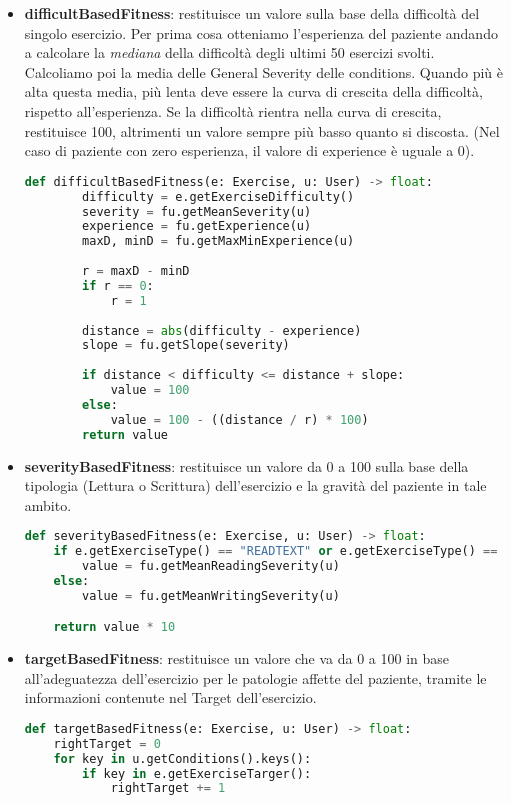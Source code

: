 \documentclass{article}
\begin{document}
\begin{itemize}

\item\textbf{difficultBasedFitness}: restituisce un valore sulla base della difficoltà del singolo esercizio. Per prima cosa otteniamo l'esperienza del paziente andando a calcolare la \textit{mediana} della difficoltà degli ultimi 50 esercizi svolti. Calcoliamo poi la media delle General Severity delle conditions. Quando più è alta questa media, più lenta deve essere la curva di crescita della difficoltà, rispetto all'esperienza. Se la difficoltà rientra nella curva di crescita, restituisce 100, altrimenti un valore sempre più basso quanto si discosta. (Nel caso di paziente con zero esperienza, il valore di experience è uguale a 0).
\begin{lstlisting}[language = Python]
    def difficultBasedFitness(e: Exercise, u: User) -> float:
        difficulty = e.getExerciseDifficulty()
        severity = fu.getMeanSeverity(u)
        experience = fu.getExperience(u)
        maxD, minD = fu.getMaxMinExperience(u)
    
        r = maxD - minD
        if r == 0:
            r = 1
    
        distance = abs(difficulty - experience)
        slope = fu.getSlope(severity)
    
        if distance < difficulty <= distance + slope:
            value = 100
        else:
            value = 100 - ((distance / r) * 100)
        return value
\end{lstlisting}


\item\textbf{severityBasedFitness}: restituisce un valore da 0 a 100 sulla base della tipologia (Lettura o Scrittura) dell'esercizio e la gravità del paziente in tale ambito.
\begin{lstlisting}[language = Python]
    def severityBasedFitness(e: Exercise, u: User) -> float:
    if e.getExerciseType() == "READTEXT" or e.getExerciseType() == "TEXTTOIMAGES" or e.getExerciseType() == "READIMAGES":
        value = fu.getMeanReadingSeverity(u)
    else:
        value = fu.getMeanWritingSeverity(u)

    return value * 10
\end{lstlisting}



\item\textbf{targetBasedFitness}: restituisce un valore che va da 0 a 100 in base all'adeguatezza dell'esercizio per le patologie affette del paziente, tramite le informazioni contenute nel Target dell'esercizio.
\begin{lstlisting}[language = Python]
    def targetBasedFitness(e: Exercise, u: User) -> float:
    rightTarget = 0
    for key in u.getConditions().keys():
        if key in e.getExerciseTarger():
            rightTarget += 1


\end{lstlisting}
\end{itemize}
\end{document}
